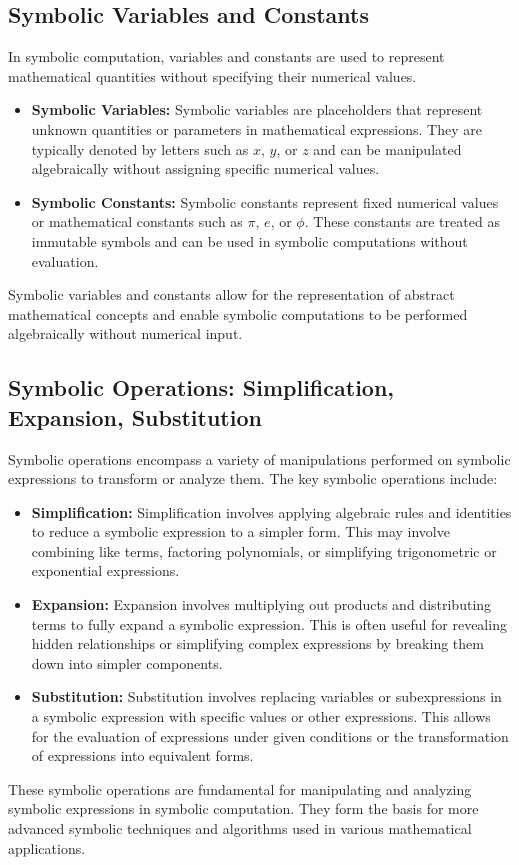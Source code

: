 \subsection{Symbolic Variables and Constants}

In symbolic computation, variables and constants are used to represent mathematical quantities without specifying their numerical values.
%
\begin{itemize}
  \setlength{\itemsep}{0.0em}
  \item \textbf{Symbolic Variables:} Symbolic variables are placeholders that represent unknown quantities or parameters in mathematical expressions. They are typically denoted by letters such as \( x \), \( y \), or \( z \) and can be manipulated algebraically without assigning specific numerical values.
  \item \textbf{Symbolic Constants:} Symbolic constants represent fixed numerical values or mathematical constants such as \( \pi \), \( e \), or \( \phi \). These constants are treated as immutable symbols and can be used in symbolic computations without evaluation.
\end{itemize}
%
Symbolic variables and constants allow for the representation of abstract mathematical concepts and enable symbolic computations to be performed algebraically without numerical input.

\subsection{Symbolic Operations: Simplification, Expansion, Substitution}

Symbolic operations encompass a variety of manipulations performed on symbolic expressions to transform or analyze them. The key symbolic operations include:
%
\begin{itemize}
  \setlength{\itemsep}{0.0em}
  \item \textbf{Simplification:} Simplification involves applying algebraic rules and identities to reduce a symbolic expression to a simpler form. This may involve combining like terms, factoring polynomials, or simplifying trigonometric or exponential expressions.
  \item \textbf{Expansion:} Expansion involves multiplying out products and distributing terms to fully expand a symbolic expression. This is often useful for revealing hidden relationships or simplifying complex expressions by breaking them down into simpler components.
  \item \textbf{Substitution:} Substitution involves replacing variables or subexpressions in a symbolic expression with specific values or other expressions. This allows for the evaluation of expressions under given conditions or the transformation of expressions into equivalent forms.
\end{itemize}
%
These symbolic operations are fundamental for manipulating and analyzing symbolic expressions in symbolic computation. They form the basis for more advanced symbolic techniques and algorithms used in various mathematical applications.

